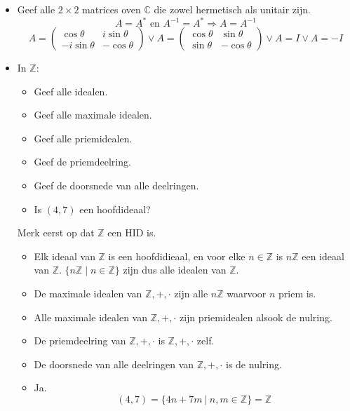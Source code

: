 \documentclass[main.tex]{subfiles}
\begin{document}
\begin{itemize}
 \item Geef alle $2\times 2$ matrices oven $\mathbb{C}$ die zowel hermetisch als unitair zijn.
   \[ A = A^{*} \text{ en } A^{-1}=A^{*} \Rightarrow A=A^{-1}\]
   \[ A = 
   \begin{pmatrix}
     \cos\theta & i\sin\theta\\
     -i\sin\theta & -\cos\theta
   \end{pmatrix}
   \vee 
   A =
   \begin{pmatrix}
     \cos\theta & \sin\theta\\
     \sin\theta & -\cos\theta
   \end{pmatrix}
   \vee 
   A = I
   \vee 
   A = -I
   \]
 \item In $\mathbb{Z}$:
   \begin{itemize}
   \item Geef alle idealen.
   \item Geef alle maximale idealen.
   \item Geef alle priemidealen.
   \item Geef de priemdeelring.
   \item Geef de doorsnede van alle deelringen.
   \item Is $(4,7)$ een hoofdideaal?
   \end{itemize}

   Merk eerst op dat $\mathbb{Z}$ een HID is.

   \begin{itemize}
   \item Elk ideaal van $\mathbb{Z}$ is een hoofdidieaal, en voor elke $n\in \mathbb{Z}$ is $n\mathbb{Z}$ een ideaal van $\mathbb{Z}$.
     $\{ n\mathbb{Z} \mid n \in \mathbb{Z} \}$ zijn dus alle idealen van $\mathbb{Z}$.
   \item De maximale idealen van $\mathbb{Z},+,\cdot$ zijn alle $n\mathbb{Z}$ waarvoor $n$ priem is.
   \item Alle maximale idealen van $\mathbb{Z},+,\cdot$ zijn priemidealen alsook de nulring.
   \item De priemdeelring van $\mathbb{Z},+,\cdot$ is $\mathbb{Z},+,\cdot$ zelf.
   \item De doorsnede van alle deelringen van $\mathbb{Z},+,\cdot$ is de nulring.
   \item Ja.
     \[ (4,7) = \{ 4n + 7m \ |\ n,m \in \mathbb{Z}  \} = \mathbb{Z} \]
   \end{itemize}


\end{itemize}
\end{document}
